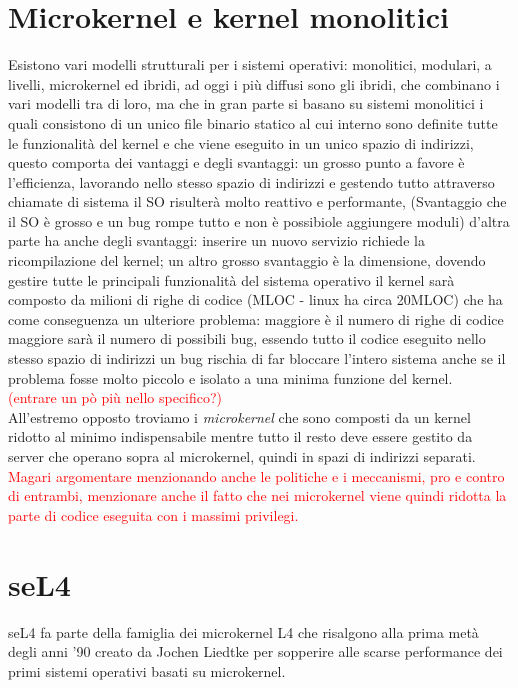 \section{Microkernel e kernel monolitici}
Esistono vari modelli strutturali per i sistemi operativi: monolitici, modulari, a livelli, microkernel ed ibridi, ad oggi i più diffusi sono gli ibridi, che combinano i vari modelli tra di loro, ma che in gran parte si basano su sistemi monolitici i quali consistono di un unico file binario statico al cui interno sono definite tutte le funzionalità del kernel e che viene eseguito in un unico spazio di indirizzi, questo comporta dei vantaggi e degli svantaggi: un grosso punto a favore è  l'efficienza, lavorando nello stesso spazio di indirizzi e gestendo tutto attraverso chiamate di sistema il SO risulterà molto reattivo e performante, (Svantaggio che il SO è grosso e un bug rompe tutto e non è possibiole aggiungere moduli) d'altra parte ha anche degli svantaggi: inserire un nuovo servizio richiede la ricompilazione del kernel; un altro grosso svantaggio è la dimensione, dovendo gestire tutte le principali funzionalità del sistema operativo il kernel sarà composto da milioni di righe di codice (MLOC - linux ha circa 20MLOC) che ha come conseguenza un ulteriore problema: maggiore è il numero di righe di codice maggiore sarà il numero di possibili bug, essendo tutto il codice eseguito nello stesso spazio di indirizzi un bug rischia di far bloccare l'intero sistema anche se il problema fosse molto piccolo e isolato a una minima funzione del kernel.\\
\textcolor{red}{(entrare un pò più nello specifico?)}\\
All'estremo opposto troviamo i \textit{microkernel} che sono composti da un kernel ridotto al minimo indispensabile mentre tutto il resto deve essere gestito da server che operano sopra al microkernel, quindi in spazi di indirizzi separati.\\
\textcolor{red}{Magari argomentare menzionando anche le politiche e i meccanismi, pro e contro di entrambi, menzionare anche il fatto che nei microkernel viene quindi ridotta la parte di codice eseguita con i massimi privilegi.}\\

\section{seL4}
seL4 fa parte della famiglia dei microkernel L4 che risalgono alla prima metà degli anni '90 creato da Jochen Liedtke per sopperire alle scarse performance dei primi sistemi operativi basati su microkernel.